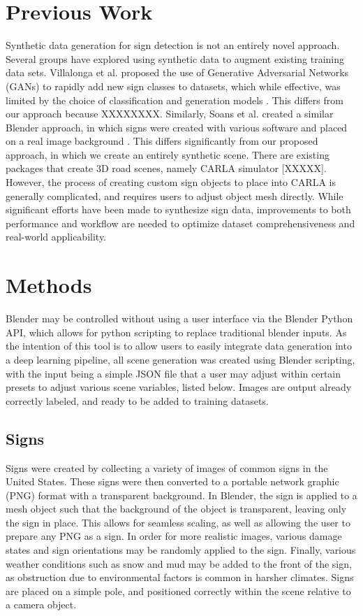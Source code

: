 \documentclass[journal]{IEEEtran}
\begin{document}
\section{Previous Work}

 Synthetic data generation for sign detection is not an entirely novel approach. Several groups have explored using synthetic data to augment existing training data sets. Villalonga et al. proposed the use of Generative Adversarial Networks (GANs) to rapidly add new sign classes to datasets, which while effective, was limited by the choice of classification and generation models \cite{GAN_artificial_data}. This differs from our approach because XXXXXXXX. Similarly, Soans et al. created a similar Blender approach, in which signs were created with various software and placed on a real image background \cite{blender_paper}. This differs significantly from our proposed approach, in which we create an entirely synthetic scene. There are existing packages that create 3D road scenes, namely CARLA simulator [XXXXX]. However, the process of creating custom sign objects to place into CARLA is generally complicated, and requires users to adjust object mesh directly. While significant efforts have been made to synthesize sign data, improvements to both performance and workflow are needed to optimize dataset comprehensiveness and real-world applicability. 
\section{Methods}
Blender may be controlled without using a user interface via the Blender Python API, which allows for python scripting to replace traditional blender inputs. As the intention of this tool is to allow users to easily integrate data generation into a deep learning pipeline, all scene generation was created using Blender scripting, with the input being a simple JSON file that a user may adjust within certain presets to adjust various scene variables, listed below. Images are output already correctly labeled, and ready to be added to training datasets. 
\subsection{Signs}
Signs were created by collecting a variety of images of common signs in the United States. These signs were then converted to a portable network graphic (PNG) format with a transparent background. In Blender, the sign is applied to a mesh object such that the background of the object is transparent, leaving only the sign in place. This allows for seamless scaling, as well as allowing the user to prepare any PNG as a sign. In order for more realistic images, various damage states and sign orientations may be randomly applied to the sign. Finally, various weather conditions such as snow and mud may be added to the front of the sign, as obstruction due to environmental factors is common in harsher climates. Signs are placed on a simple pole, and positioned correctly within the scene relative to a camera object. 
\end{document}
